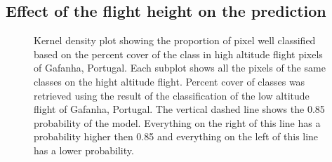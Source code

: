 \documentclass[
  number]{elsarticle}
\begin{document}
\subsection{Effect of the flight height on the
prediction}\label{effect-of-the-flight-height-on-the-prediction}

\label{cell-fig-upscaling}
\begin{figure}[H]


\caption{\label{fig-upscaling}Kernel density plot showing the proportion
of pixel well classified based on the percent cover of the class in high
altitude flight pixels of Gafanha, Portugal. Each subplot shows all the
pixels of the same classes on the hight altitude flight. Percent cover
of classes was retrieved using the result of the classification of the
low altitude flight of Gafanha, Portugal. The vertical dashed line shows
the 0.85 probability of the model. Everything on the right of this line
has a probability higher then 0.85 and everything on the left of this
line has a lower probability.}

\end{figure}%
\end{document}
